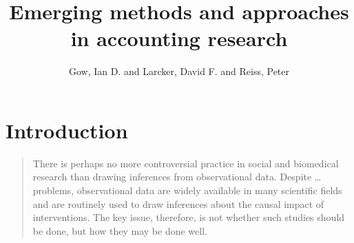 \documentclass[11pt]{amsart}
\title[Emerging approaches]{Emerging methods and approaches in accounting research}
\author{Gow, Ian D. and Larcker, David F. and Reiss, Peter}
\begin{document}
\usetikzlibrary{automata, shapes, calc, positioning}




\section{Introduction}

\begin{quotation}
	There is perhaps no more controversial practice in social and biomedical research than drawing inferences from observational data.
	Despite \dots problems, observational data are widely available in many scientific fields and are routinely used to draw inferences about the causal impact of interventions.
	The key issue, therefore, is not whether such studies should be done, but how they may be done well.
\end{quotation}

\end{document}
